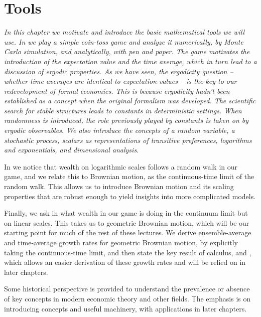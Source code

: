 \chapter{Tools}

{\it In this chapter we motivate and introduce the basic mathematical tools we will use. In  we play a simple coin-toss game and analyze it 
numerically, by Monte Carlo simulation, and analytically, with pen and paper. The game motivates the 
introduction of the expectation value and the time average, which in turn 
lead to a discussion of ergodic properties. As we have seen, the ergodicity question  -- whether time averages are identical to expectation values -- is the key to our redevelopment of formal economics. This is because ergodicity hadn't been established as a concept when the original formalism was developed. The scientific search for stable structures leads to constants in deterministic settings. When randomness is introduced, the role previously played by constants is taken on by ergodic observables.
We also introduce the concepts of a random variable, a stochastic process, scalars as representations of transitive preferences, logarithms and exponentials, and dimensional analysis.

In  we notice that wealth on logarithmic scales follows a random walk in our game, and we relate this to Brownian motion, as the continuous-time limit of the random walk. This allows us to introduce Brownian motion and its scaling properties that are robust enough to yield insights into more complicated models.

Finally, we ask in  what wealth in our game is doing in the continuum limit but on linear scales. This takes us to geometric Brownian motion, which will be our starting point for much of the rest of these lectures. We derive ensemble-average and time-average growth rates for geometric Brownian motion, by explicitly taking the continuous-time limit, and then state the key result of \Ito calculus,  and , which allows an easier derivation of these growth rates and will be relied on in later chapters.

Some historical perspective is provided to understand the prevalence or
absence of key concepts in modern economic theory and other fields.
The emphasis is on introducing concepts and useful machinery, with applications in later chapters.}
\newpage

